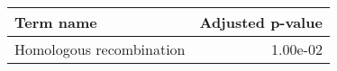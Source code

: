 \begin{tabular}{lr}
\toprule
               Term name &  Adjusted p-value \\
\midrule
Homologous recombination &          1.00e-02 \\
\bottomrule
\end{tabular}
